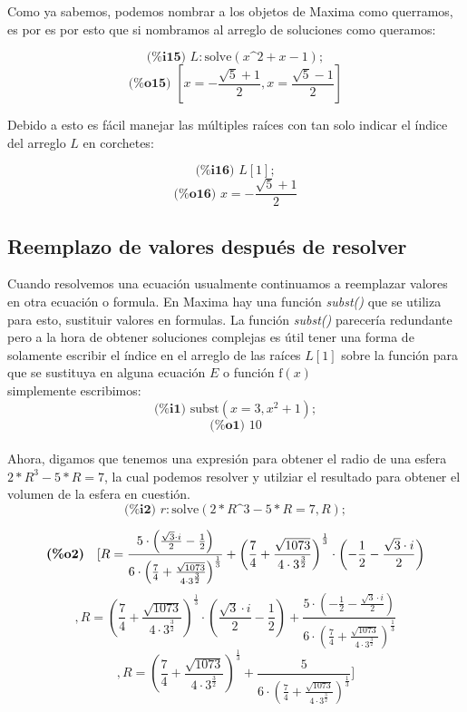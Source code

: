 \documentclass{article}
\begin{document}
Como ya sabemos, podemos nombrar a los objetos de Maxima como querramos, es por es por esto que si nombramos al arreglo de soluciones como queramos:

\[ \textbf{(\%i15) }L:\text{solve}(x\text{\textasciicircum}2+x-1); \]
\[ \textbf{(\%o15) }[x=-\frac{\sqrt{5}+1}{2},x=\frac{\sqrt{5}-1}{2}] \]

Debido a esto es fácil manejar las múltiples raíces con tan solo indicar el índice del arreglo $L$ en corchetes:

\[ \textbf{(\%i16) }L[1]; \]
\[ \textbf{(\%o16) }x=-\frac{\sqrt{5}+1}{2} \]

\subsection{Reemplazo de valores después de resolver}

Cuando resolvemos una ecuación usualmente continuamos a reemplazar valores en otra ecuación o formula. En Maxima hay una función \textit{subst()} que se utiliza para esto, sustituir valores en formulas. La función \textit{subst()} parecería redundante pero a la hora de obtener soluciones complejas es útil tener una forma de solamente escribir el índice en el arreglo de las raíces $L[1]$ sobre la función para que se sustituya en alguna ecuación $E$ o función $\text{f}(x)$
~\\
simplemente escribimos:
\[ \textbf{(\%i1) }\text{subst}(x=3,x^2+1); \]
\[ \textbf{(\%o1) }10 \]
~\\
Ahora, digamos que tenemos una expresión para obtener el radio de una esfera $2*R^3-5*R=7$, la cual podemos resolver y utilziar el resultado para obtener el volumen de la esfera en cuestión.
\[ \textbf{(\%i2) }r:\text{solve}(2*R\text{\textasciicircum}3-5*R=7,R); \]

\newpage

\[ \mathrm{\tt \textbf{(\%o2)} }\quad [R=\frac{5\cdot \left( \frac{\sqrt{3}\cdot i}{2}-\frac{1}{2}\right) }{6\cdot {{\left( \frac{7}{4}+\frac{\sqrt{1073}}{4\cdot {{3}^{\frac{3}{2}}}}\right) }^{\frac{1}{3}}}}+{{\left( \frac{7}{4}+\frac{\sqrt{1073}}{4\cdot {{3}^{\frac{3}{2}}}}\right) }^{\frac{1}{3}}}\cdot \left( -\frac{1}{2}-\frac{\sqrt{3}\cdot i}{2}\right) \] 
\[ ,R={{\left( \frac{7}{4}+\frac{\sqrt{1073}}{4\cdot {{3}^{\frac{3}{2}}}}\right) }^{\frac{1}{3}}}\cdot \left( \frac{\sqrt{3}\cdot i}{2}-\frac{1}{2}\right) +\frac{5\cdot \left( -\frac{1}{2}-\frac{\sqrt{3}\cdot i}{2}\right) }{6\cdot {{\left( \frac{7}{4}+\frac{\sqrt{1073}}{4\cdot {{3}^{\frac{3}{2}}}}\right) }^{\frac{1}{3}}}} \] 
\[ ,R={{\left( \frac{7}{4}+\frac{\sqrt{1073}}{4\cdot {{3}^{\frac{3}{2}}}}\right) }^{\frac{1}{3}}}+\frac{5}{6\cdot {{\left( \frac{7}{4}+\frac{\sqrt{1073}}{4\cdot {{3}^{\frac{3}{2}}}}\right) }^{\frac{1}{3}}}}] \]
\end{document}
